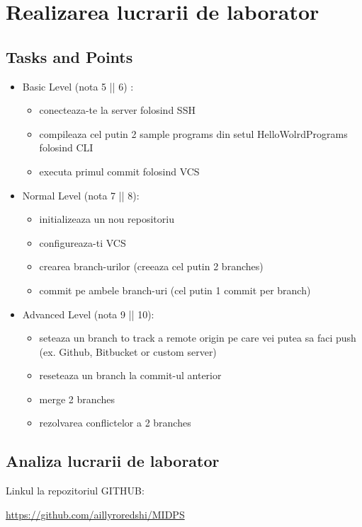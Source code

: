 \section{Realizarea lucrarii de laborator}

\subsection{Tasks and Points}

\begin{itemize}
\item Basic Level (nota 5 || 6) : 
\begin{itemize}

    \item conecteaza-te la server folosind SSH
    \item compileaza cel putin 2 sample programs din setul HelloWolrdPrograms folosind CLI
    \item executa primul commit folosind VCS

\end{itemize}
\item Normal Level (nota 7 || 8):
\begin{itemize}

   \item initializeaza un nou repositoriu
   \item configureaza-ti VCS
   \item crearea branch-urilor (creeaza cel putin 2 branches)
   \item commit pe ambele branch-uri (cel putin 1 commit per branch)

\end{itemize}
\item Advanced Level (nota 9 || 10): 
\begin{itemize}

   \item seteaza un branch to track a remote origin pe care vei putea sa faci push (ex. Github, Bitbucket or custom server)
   \item reseteaza un branch la commit-ul anterior
   \item merge 2 branches
   \item rezolvarea conflictelor a 2 branches

\end{itemize}
\end{itemize}

\subsection{Analiza lucrarii de laborator}
Linkul la repozitoriul GITHUB:
\begin{center}
\url{https://github.com/aillyroredshi/MIDPS}
\end{center}

